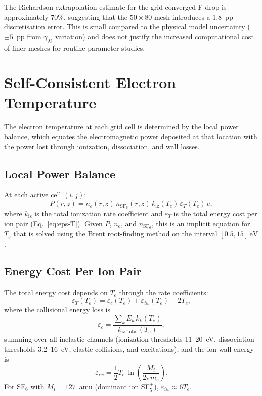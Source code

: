 \documentclass[11pt,a4paper]{report}
\newcommand{\SFsix}{\mathrm{SF}_6}
\newcommand{\eV}{\,\mathrm{eV}}
\newcommand{\Te}{T_e}
\begin{document}
The Richardson extrapolation estimate for the grid-converged F drop is approximately 70\%, suggesting that the $50 \times 80$ mesh introduces a 1.8~pp discretisation error.  This is small compared to the physical model uncertainty ($\pm 5$~pp from $\gamma_\mathrm{Al}$ variation) and does not justify the increased computational cost of finer meshes for routine parameter studies.


\section{Self-Consistent Electron Temperature}
\label{sec:Te-solver}

The electron temperature at each grid cell is determined by the local power balance, which equates the electromagnetic power deposited at that location with the power lost through ionization, dissociation, and wall losses.

\subsection{Local Power Balance}

At each active cell $(i,j)$:
\begin{equation}
  \boxed{P(r,z) = n_e(r,z)\,n_{\SFsix}(r,z)\,k_\mathrm{iz}(\Te)\,\varepsilon_T(\Te)\,e,}
  \label{eq:local-power-balance}
\end{equation}
where $k_\mathrm{iz}$ is the total ionization rate coefficient and $\varepsilon_T$ is the total energy cost per ion pair (Eq.~\eqref{eq:eps-T}).  Given $P$, $n_e$, and $n_{\SFsix}$, this is an implicit equation for $\Te$ that is solved using the Brent root-finding method  on the interval $[0.5, 15]\eV$.

\subsection{Energy Cost Per Ion Pair}

The total energy cost depends on $\Te$ through the rate coefficients:
\begin{equation}
  \varepsilon_T(\Te) = \varepsilon_c(\Te) + \varepsilon_{iw}(\Te) + 2\Te,
\end{equation}
where the collisional energy loss is
\begin{equation}
  \varepsilon_c = \frac{\sum_k E_k\,k_k(\Te)}{k_\mathrm{iz,total}(\Te)},
\end{equation}
summing over all inelastic channels (ionization thresholds 11--20~eV, dissociation thresholds 3.2--16~eV, elastic collisions, and excitations), and the ion wall energy is
\begin{equation}
  \varepsilon_{iw} = \frac{1}{2}\Te\,\ln\!\left(\frac{M_i}{2\pi m_e}\right).
\end{equation}
For SF$_6$ with $M_i = 127$~amu (dominant ion SF$_5^+$), $\varepsilon_{iw} \approx 6\Te$.
\end{document}
